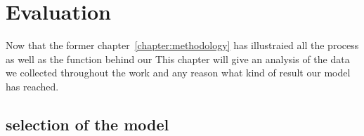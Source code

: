 \chapter{Evaluation}\label{chapter:evaluation}

Now that the former chapter~\ref{chapter:methodology} has illustraied all the process as well as the function behind our This chapter will give an analysis of the data we collected throughout the work and any reason what kind of result our model has reached.

\section{selection of the model}

